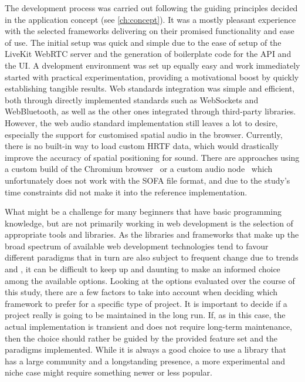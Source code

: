 The development process was carried out following the guiding principles decided in the application concept (see \autoref{ch:concept}).
It was a mostly pleasant experience with the selected frameworks delivering on their promised functionality and ease of use.
The initial setup was quick and simple due to the ease of setup of the LiveKit \ac{WebRTC} server and the generation of boilerplate code for the \ac{API} and the \ac{UI}.
A dvelopment environment was set up equally easy and work immediately started with practical experimentation, providing a motivational boost by quickly establishing tangible results.
Web standards integration was simple and efficient, both through directly implemented standards such as WebSockets and WebBluetooth, as well as the other ones integrated through third-party libraries.
However, the web audio standard implementation still leaves a lot to desire, especially the support for customised spatial audio in the browser.
Currently, there is no built-in way to load custom \ac{HRTF} data, which would drastically improve the accuracy of spatial positioning for sound.
There are approaches using a custom build of the Chromium browser~\parencite{chromiumCustomHrtf} or a custom audio node~\parencite{customHrtfAudioNode} which unfortunately does not work with the \ac{SOFA} file format, and due to the study's time constraints did not make it into the reference implementation.

What might be a challenge for many beginners that have basic programming knowledge, but are not primarily working in web development is the selection of appropriate tools and libraries.
As the libraries and frameworks that make up the broad spectrum of available web development technologies tend to favour different paradigms that in turn are also subject to frequent change due to trends and , it can be difficult to keep up and daunting to make an informed choice among the available options.
Looking at the options evaluated over the course of this study, there are a few factors to take into account when deciding which framework to prefer for a specific type of project.
It is important to decide if a project really is going to be maintained in the long run.
If, as in this case, the actual implementation is transient and does not require long-term maintenance, then the choice should rather be guided by the provided feature set and the paradigms implemented.
While it is always a good choice to use a library that has a large community and a longstanding presence, a more experimental and niche case might require something newer or less popular.

